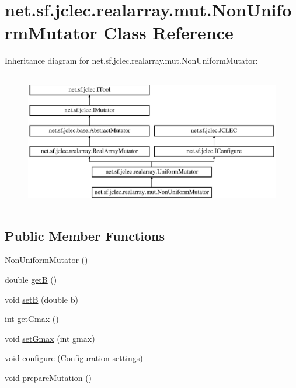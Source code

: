 \hypertarget{classnet_1_1sf_1_1jclec_1_1realarray_1_1mut_1_1_non_uniform_mutator}{\section{net.\-sf.\-jclec.\-realarray.\-mut.\-Non\-Uniform\-Mutator Class Reference}
\label{classnet_1_1sf_1_1jclec_1_1realarray_1_1mut_1_1_non_uniform_mutator}
}
Inheritance diagram for net.\-sf.\-jclec.\-realarray.\-mut.\-Non\-Uniform\-Mutator\-:\begin{figure}[H]
\begin{center}
\leavevmode
\includegraphics[height=6.000000cm]{classnet_1_1sf_1_1jclec_1_1realarray_1_1mut_1_1_non_uniform_mutator}
\end{center}
\end{figure}
\subsection*{Public Member Functions}
\begin{DoxyCompactItemize}
\item 
\hyperlink{classnet_1_1sf_1_1jclec_1_1realarray_1_1mut_1_1_non_uniform_mutator_ae9d4a32231922b0391454b524e4206e9}{Non\-Uniform\-Mutator} ()
\item 
double \hyperlink{classnet_1_1sf_1_1jclec_1_1realarray_1_1mut_1_1_non_uniform_mutator_ab495d7eeb6cfc36936ae0689cea11580}{get\-B} ()
\item 
void \hyperlink{classnet_1_1sf_1_1jclec_1_1realarray_1_1mut_1_1_non_uniform_mutator_a1bd340e1856602590c669e82975a2ab3}{set\-B} (double b)
\item 
int \hyperlink{classnet_1_1sf_1_1jclec_1_1realarray_1_1mut_1_1_non_uniform_mutator_ae5232df579ab378329cfe2a6d2d5f7b4}{get\-Gmax} ()
\item 
void \hyperlink{classnet_1_1sf_1_1jclec_1_1realarray_1_1mut_1_1_non_uniform_mutator_a529d6ffd5bab8f899cf743d5bc447258}{set\-Gmax} (int gmax)
\item 
void \hyperlink{classnet_1_1sf_1_1jclec_1_1realarray_1_1mut_1_1_non_uniform_mutator_a6a07c2b88ec97ccc46e6daf35c99aeaa}{configure} (Configuration settings)
\item 
void \hyperlink{classnet_1_1sf_1_1jclec_1_1realarray_1_1mut_1_1_non_uniform_mutator_af0c404dbbc03b506c7517729bd479181}{prepare\-Mutation} ()
\end{DoxyCompactItemize}
